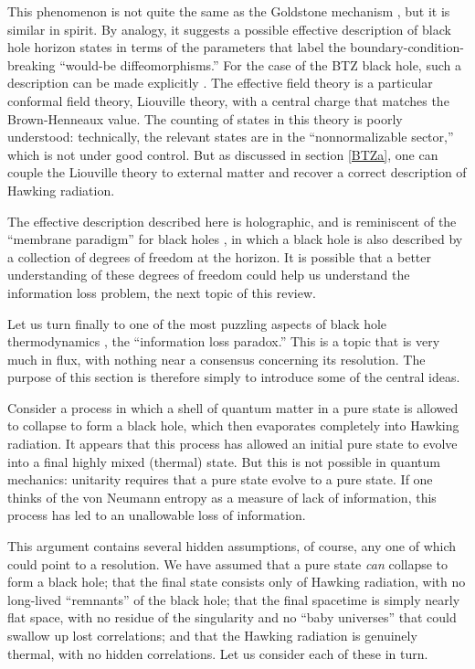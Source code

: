 \documentclass[11pt]{article}
\makeatletter
\def\section{\@startsection{section}{1}{\z@}{3.5ex plus 1ex minus
   .2ex}{2.3ex plus .2ex}{\large\bf}}
\makeatother
\begin{document}
This phenomenon is not quite the same as the Goldstone mechanism
\cite{Goldstone}, but it is similar in spirit.  By analogy, it suggests a 
possible effective description of black hole horizon states in terms of 
the parameters that label the boundary-condition-breaking ``would-be
diffeomorphisms.''  For the case of the BTZ black hole, such a
description can be made explicitly \cite{CarlipBTZb,Carlipasymp}.  
The effective field theory is a particular conformal field theory, Liouville 
theory, with a central charge that matches the Brown-Henneaux value.  
The counting of states in this theory is poorly understood: technically,
the relevant states are in the ``nonnormalizable sector,'' which is not
under good control.  But as discussed in section \ref{BTZa}, one can 
couple the Liouville theory to external matter and recover a correct
description of Hawking radiation.

The effective description described here is holographic, and
is reminiscent of the ``membrane paradigm'' for black holes 
\cite{membrane,Parikhz}, in which a black hole is also described by 
a collection of degrees of freedom at the horizon.  It is possible
that a better understanding of these degrees of freedom could
help us understand the information loss problem, the next
topic of this review.

\section{The information loss problem}

Let us turn finally to one of the most puzzling aspects of black hole
thermodynamics \cite{Hawking_info}, the ``information loss paradox.''  
This is a topic that is very much in flux, with nothing near a consensus 
concerning its resolution.  The purpose of this section is therefore 
simply to introduce some of the central ideas.

Consider a process in which a shell of quantum matter in a pure state 
is allowed to collapse to form a black hole, which then evaporates
completely into Hawking radiation.  It appears that this process has
allowed an initial pure state to evolve into a final highly mixed
(thermal) state.  But this is not possible in quantum mechanics:
unitarity requires that a pure state evolve to a pure state.  If one
thinks of the von Neumann entropy as a measure of lack of information,
this process has led to an unallowable loss of information.

This argument contains several hidden assumptions, of course, any
one of which could point to a resolution.  We have assumed that a
pure state \emph{can} collapse to form a black hole; that the final
state consists only of Hawking radiation, with no long-lived  
``remnants'' of the black hole; that the final spacetime is simply
nearly flat space, with no residue of the singularity and no
``baby universes'' that could swallow up lost correlations; and
that the Hawking radiation is genuinely thermal, with no hidden
correlations.  Let us consider each of these in turn.
\end{document}
